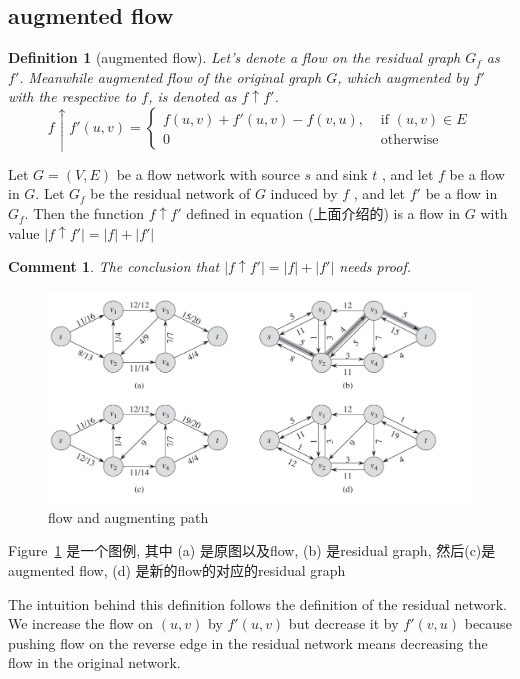 \documentclass[a4paper, 10pt]{ctexart} %
\newtheorem{definition}{Definition}
\newtheorem{corollary}{Comment}
\begin{document}
\subsection{augmented flow}
\begin{definition}[augmented flow]
Let's denote a flow on the residual 
graph $ G_f $ as $ f' $.
Meanwhile augmented 
flow of the original graph $ G $, which
augmented by $f'$ with the respective to
$f$, is 
denoted as $ f \uparrow f' $.
$$ 
f\uparrow f' \left( u ,v\right)= 
\begin{cases} f( u , v) + f' \left(u ,v\right) - f\left( v , u\right), &\text{ if } \left(u ,v\right) \in E \\
     0 & \text{ otherwise} 
\end{cases} 
$$
\end{definition}
Let $ G = \left(V, E\right) $ be a flow network with 
source $ s $ and sink $ t $ , and 
let $ f $ be a flow in $ G $. 
Let $ G_{f} $ be the residual network 
of $ G $ induced by $ f $ , 
and let $ f' $ be a flow in $ G_{f} $. 
Then the function $ f \uparrow f' $ 
defined in equation (上面介绍的) is a 
flow in $ G $ with value $ |f\uparrow f' | = |f| + |f'| $ 
\begin{corollary}
The conclusion that 
$\left| f \uparrow f' \right|  = \left| f \right|  + \left| f' \right| $
needs proof.
\end{corollary}
\begin{figure}
    \centering
    \includegraphics[scale = 0.5]{mf1.png}
    \caption{flow and augmenting path}
    \label{fig:mf1}
\end{figure}

Figure~\ref{fig:mf1} 是一个图例, 其中 (a) 是原图以及flow, (b) 是residual graph, 
然后(c)是augmented flow, (d) 是新的flow的对应的residual graph

The intuition behind this definition follows the definition 
of the residual network.
We increase the flow on $ (u,v) $ by 
$ f'(u,v) $ but decrease it by $ f'(v,u) $ because
pushing flow on the reverse edge 
in the residual network means decreasing the
flow in the original network. 
\end{document}
